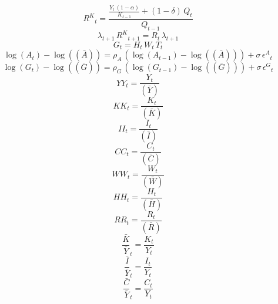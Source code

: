 \begin{dmath}
{R^{K}}_{t}=\frac{\frac{{Y}_{t}\, \left(1-{{\alpha}}\right)}{{K}_{t-1}}+\left(1-{{\delta}}\right)\, {Q}_{t}}{{Q}_{t-1}}
\end{dmath}
\begin{dmath}
{\lambda}_{t+1}\, {R^{K}}_{t+1}={R}_{t}\, {\lambda}_{t+1}
\end{dmath}
\begin{dmath}
{G}_{t}={H}_{t}\, {W}_{t}\, {T}_{t}
\end{dmath}
\begin{dmath}
\log\left({A}_{t}\right)-\log\left((\bar{A})\right)={{\rho_{A}}}\, \left(\log\left({A}_{t-1}\right)-\log\left((\bar{A})\right)\right)+{{\sigma}}\, {{\epsilon^{A}}}_{t}
\end{dmath}
\begin{dmath}
\log\left({G}_{t}\right)-\log\left((\bar{G})\right)={{\rho_{G}}}\, \left(\log\left({G}_{t-1}\right)-\log\left((\bar{G})\right)\right)+{{\sigma}}\, {{\epsilon^{G}}}_{t}
\end{dmath}
\begin{dmath}
{YY}_{t}=\frac{{Y}_{t}}{(\bar{Y})}
\end{dmath}
\begin{dmath}
{KK}_{t}=\frac{{K}_{t}}{(\bar{K})}
\end{dmath}
\begin{dmath}
{II}_{t}=\frac{{I}_{t}}{(\bar{I})}
\end{dmath}
\begin{dmath}
{CC}_{t}=\frac{{C}_{t}}{(\bar{C})}
\end{dmath}
\begin{dmath}
{WW}_{t}=\frac{{W}_{t}}{(\bar{W})}
\end{dmath}
\begin{dmath}
{HH}_{t}=\frac{{H}_{t}}{(\bar{H})}
\end{dmath}
\begin{dmath}
{RR}_{t}=\frac{{R}_{t}}{(\bar{R})}
\end{dmath}
\begin{dmath}
{\frac{\bar{K}}{\bar{Y}}}_{t}=\frac{{K}_{t}}{{Y}_{t}}
\end{dmath}
\begin{dmath}
{\frac{\bar{I}}{\bar{Y}}}_{t}=\frac{{I}_{t}}{{Y}_{t}}
\end{dmath}
\begin{dmath}
{\frac{\bar{C}}{\bar{Y}}}_{t}=\frac{{C}_{t}}{{Y}_{t}}
\end{dmath}
